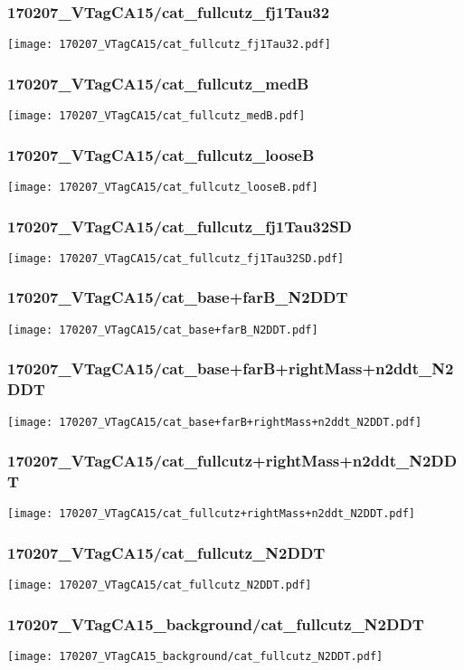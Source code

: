 \begin{frame}
   \frametitle{\small 170207\_VTagCA15/cat\_fullcutz\_fj1Tau32}
   \centering
   \texttt{[image: 170207\_VTagCA15/cat\_fullcutz\_fj1Tau32.pdf]}
\end{frame}

\begin{frame}
   \frametitle{\small 170207\_VTagCA15/cat\_fullcutz\_medB}
   \centering
   \texttt{[image: 170207\_VTagCA15/cat\_fullcutz\_medB.pdf]}
\end{frame}

\begin{frame}
   \frametitle{\small 170207\_VTagCA15/cat\_fullcutz\_looseB}
   \centering
   \texttt{[image: 170207\_VTagCA15/cat\_fullcutz\_looseB.pdf]}
\end{frame}

\begin{frame}
   \frametitle{\small 170207\_VTagCA15/cat\_fullcutz\_fj1Tau32SD}
   \centering
   \texttt{[image: 170207\_VTagCA15/cat\_fullcutz\_fj1Tau32SD.pdf]}
\end{frame}

\begin{frame}
   \frametitle{\small 170207\_VTagCA15/cat\_base+farB\_N2DDT}
   \centering
   \texttt{[image: 170207\_VTagCA15/cat\_base+farB\_N2DDT.pdf]}
\end{frame}

\begin{frame}
   \frametitle{\small 170207\_VTagCA15/cat\_base+farB+rightMass+n2ddt\_N2DDT}
   \centering
   \texttt{[image: 170207\_VTagCA15/cat\_base+farB+rightMass+n2ddt\_N2DDT.pdf]}
\end{frame}

\begin{frame}
   \frametitle{\small 170207\_VTagCA15/cat\_fullcutz+rightMass+n2ddt\_N2DDT}
   \centering
   \texttt{[image: 170207\_VTagCA15/cat\_fullcutz+rightMass+n2ddt\_N2DDT.pdf]}
\end{frame}

\begin{frame}
   \frametitle{\small 170207\_VTagCA15/cat\_fullcutz\_N2DDT}
   \centering
   \texttt{[image: 170207\_VTagCA15/cat\_fullcutz\_N2DDT.pdf]}
\end{frame}

\begin{frame}
   \frametitle{\small 170207\_VTagCA15\_background/cat\_fullcutz\_N2DDT}
   \centering
   \texttt{[image: 170207\_VTagCA15\_background/cat\_fullcutz\_N2DDT.pdf]}
\end{frame}

